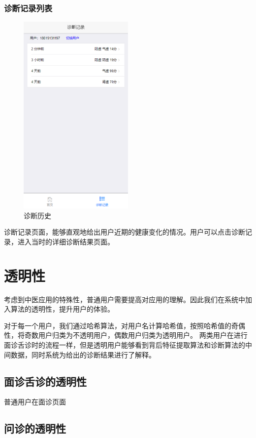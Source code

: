 \subsubsection{诊断记录列表}
\begin{figure}[ht]
    \centering
    \includegraphics[height=10cm]{images/history.png}
    \caption{诊断历史}
    \label{fig:history}
\end{figure}
诊断记录页面，能够直观地给出用户近期的健康变化的情况。用户可以点击诊断记录，进入当时的详细诊断结果页面。

\section{透明性}
考虑到中医应用的特殊性，普通用户需要提高对应用的理解。因此我们在系统中加入算法的透明性，提升用户的体验。

对于每一个用户，我们通过哈希算法，对用户名计算哈希值，按照哈希值的奇偶性，将奇数用户归类为不透明用户，偶数用户归类为透明用户。
两类用户在进行面诊舌诊时的流程一样，但是透明用户能够看到背后特征提取算法和诊断算法的中间数据，同时系统为给出的诊断结果进行了解释。

\subsection{面诊舌诊的透明性}
普通用户在面诊页面

\subsection{问诊的透明性}

